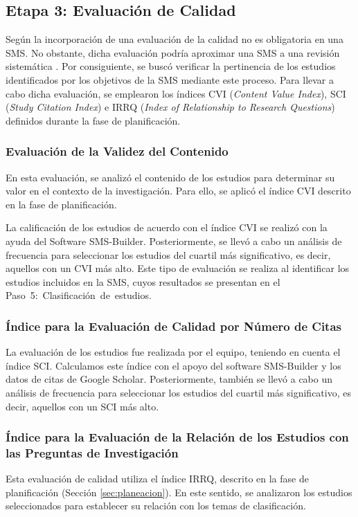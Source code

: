 %
\subsection{Etapa 3: Evaluación de Calidad}
Según \cite{Ali-01} la incorporación de una evaluación de la calidad no es obligatoria en una SMS. No obstante, dicha evaluación podría aproximar una SMS a una revisión sistemática \cite{Petersen-01}. Por consiguiente, se buscó verificar la pertinencia de los estudios identificados por los objetivos de la SMS mediante este proceso. Para llevar a cabo dicha evaluación, se emplearon los índices CVI (\textit{Content Value Index}), SCI (\textit{Study Citation Index}) e IRRQ (\textit{Index of Relationship to Research Questions}) definidos durante la fase de planificación.

\subsubsection{Evaluación de la Validez del Contenido}
En esta evaluación, se analizó el contenido de los estudios para determinar su valor en el contexto de la investigación. Para ello, se aplicó el índice CVI descrito en la fase de planificación.

La calificación de los estudios de acuerdo con el índice CVI se realizó con la ayuda del Software SMS-Builder. Posteriormente, se llevó a cabo un análisis de frecuencia para seleccionar los estudios del cuartil más significativo, es decir, aquellos con un CVI más alto. Este tipo de evaluación se realiza al identificar los \totalEtapaDos{} estudios incluidos en la SMS, cuyos resultados se presentan en el \hbox{Paso 5: Clasificación de estudios.}


\subsubsection{Índice para la Evaluación de Calidad por Número de Citas}
La evaluación de los estudios fue realizada por el equipo, teniendo en cuenta el índice SCI. Calculamos este índice con el apoyo del software SMS-Builder \cite{sms-builder-repo} y los datos de citas de Google Scholar. Posteriormente, también se llevó a cabo un análisis de frecuencia para seleccionar los estudios del cuartil más significativo, es decir, aquellos con un SCI más alto.


\subsubsection{Índice para la Evaluación de la Relación de los Estudios con las Preguntas de Investigación}
Esta evaluación de calidad utiliza el índice IRRQ, descrito en la fase de planificación (Sección \ref{sec:planeacion}). En este sentido, se analizaron los estudios seleccionados para establecer su relación con los temas de clasificación.

